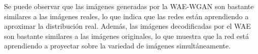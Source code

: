 Se puede observar que las imágenes generadas por la WAE-WGAN son bastante similares a las imágenes reales, lo que indica que las redes están aprendiendo a aproximar la distribución real. Además, las imágenes decodificadas por el WAE son bastante similares a las imágenes originales, lo que muestra que la red está aprendiendo a proyectar sobre la variedad de imágenes simultáneamente.








